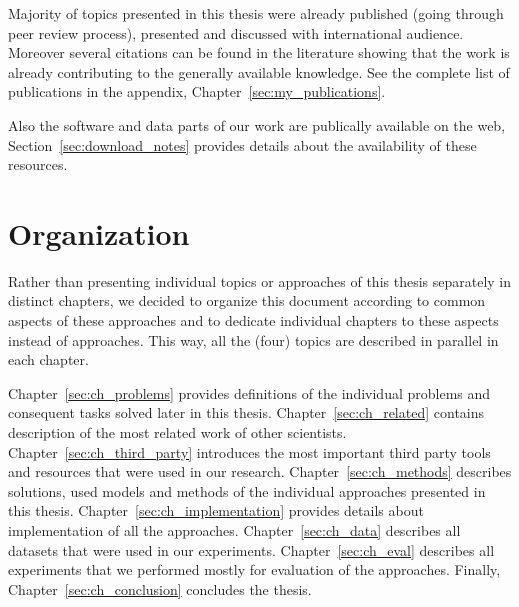 Majority of topics presented in this thesis were already published (going through peer review process), presented and discussed with international audience. Moreover several citations can be found in the literature showing that the work is already contributing to the generally available knowledge. See the complete list of publications in the appendix, Chapter~\ref{sec:my_publications}.

Also the software and data parts of our work are publically available on the web, Section~\ref{sec:download_notes} provides details about the availability of these resources.  


\section{Organization}

Rather than presenting individual topics or approaches of this thesis separately in distinct chapters, we decided to organize this document according to common aspects of these approaches and to dedicate individual chapters to these aspects instead of  approaches. This way, all the (four) topics are described in parallel in each chapter. 

Chapter~\ref{sec:ch_problems} provides definitions of the individual problems and consequent tasks solved later in this thesis.
Chapter~\ref{sec:ch_related} contains description of the most related work of other scientists.
Chapter~\ref{sec:ch_third_party} introduces the most important third party tools and resources that were used in our research.
Chapter~\ref{sec:ch_methods} describes solutions, used models and methods of the individual approaches presented in this thesis.
Chapter~\ref{sec:ch_implementation} provides details about implementation of all the approaches.
Chapter~\ref{sec:ch_data} describes all datasets that were used in our experiments.
Chapter~\ref{sec:ch_eval} describes all experiments that we performed mostly for evaluation of the approaches.
Finally, Chapter~\ref{sec:ch_conclusion} concludes the thesis.

